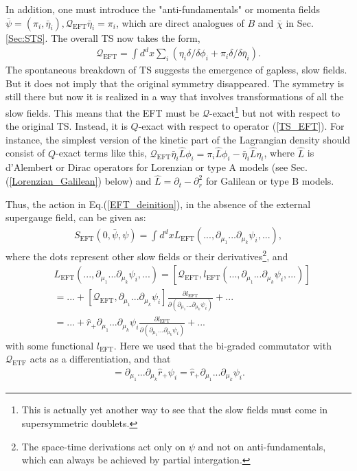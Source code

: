 \documentclass[final,5p,10pt,times,twocolumn,year]{elsarticle}
\begin{document}
In addition, one must introduce the "anti-fundamentals" or momenta fields $\bar\psi = (\pi_i,\bar\eta_i), \mathcal{Q}_\text{EFT}\bar\eta_i=\pi_i$, which are direct analogues of $B$ and $\bar\chi$ in Sec.\ref{Sec:STS}. The overall TS now takes the form, 
\begin{eqnarray}
    \mathcal{Q}_\text{EFT} =\int d^{d}x\sum\nolimits_i ( \eta_i\delta/\delta\phi_i + \pi_i\delta/\delta \bar\eta_i).\label{TS_EFT}
\end{eqnarray}
The spontaneous breakdown of TS suggests the emergence of gapless, slow fields. But it does not imply that the original symmetry disappeared. The symmetry is still there but now it is realized in a way that involves transformations of all the slow fields. This means that the EFT must be $\mathcal{Q}$-exact\footnote{This is actually yet another way to see that the slow fields must come in supersymmetric doublets.} but not with respect to the original TS. Instead, it is $Q$-exact with respect to operator (\ref{TS_EFT}). For instance, the simplest version of the kinetic part of the Lagrangian density should consist of $Q$-exact terms like this, $\mathcal{Q}_\text{EFT} \bar\eta_i \hat L \phi_i = \pi_i \hat L \phi_i - \bar\eta_i \hat L \eta_i$, where $\hat L$ is d'Alembert or Dirac operators for Lorenzian or type A models (see Sec.(\ref{Lorenzian_Galilean}) below) and $\hat L = \partial_t - \partial_r^2$ for Galilean or type B models. 

Thus, the action in Eq.(\ref{EFT_deinition}), in the absence of the external supergauge field, can be given as:
\begin{eqnarray}
S_\text{EFT}(0, \bar\psi, \psi ) = \int d^{d}x L_\text{EFT}( ..., \partial_{\mu_1} ... \partial_{\mu_k} \psi_i,...),\label{EFT_Lagrangian_zero_A}
\end{eqnarray}
where the dots represent other slow fields or their derivatives\footnote{The space-time derivations act only on $\psi$ and not on anti-fundamentals, which can always be achieved by partial intergation.}, and
\begin{eqnarray}
    &L_\text{EFT}( ..., \partial_{\mu_1} ... \partial_{\mu_k} \psi_i,...) = [\mathcal{Q}_\text{EFT}, l_\text{EFT}(..., \partial_{\mu_1} ... \partial_{\mu_k} \psi_i,...)]\nonumber\\
    &= ... + [\mathcal{Q}_\text{EFT}, \partial_{\mu_1} ... \partial_{\mu_k} \psi_i] \frac{\partial l_\text{EFT}}{\partial (\partial_{\mu_1} ... \partial_{\mu_k} \psi_i)} + ...\nonumber\\
    &= ... + \hat r_+ \partial_{\mu_1} ... \partial_{\mu_k} \psi_i \frac{\partial l_\text{EFT}}{\partial (\partial_{\mu_1} ... \partial_{\mu_k} \psi_i)}  + ...\label{Q_exact_action}
\end{eqnarray}
with some functional $l_\text{EFT}$. Here we used that the bi-graded commutator with $\mathcal Q_\text{ETF}$ acts as a differentiation, and that
\begin{eqnarray}
    [\mathcal{Q}_\text{EFT}, \partial_{\mu_1} ... \partial_{\mu_k} \psi_i] = \partial_{\mu_1} ... \partial_{\mu_k} \hat r_+ \psi_i= \hat r_+ \partial_{\mu_1} ... \partial_{\mu_k}  \psi_i.\label{Q_action}
\end{eqnarray}
\end{document}
